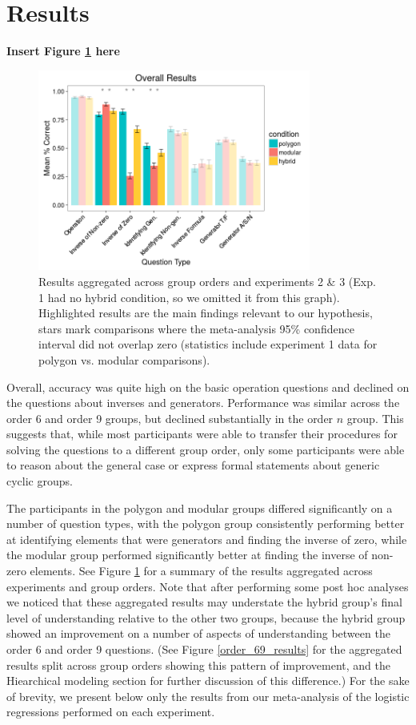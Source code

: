 \documentclass[man,10pt]{apa6}
\begin{document}
\section{Results}
\begin{center} 
{\bf Insert Figure \ref{overall_results} here} 
\end{center}
\begin{figure}
\centering
\includegraphics[width=0.8\textwidth]{figures/overall_results.png}
\caption{Results aggregated across group orders and experiments 2 \& 3 (Exp. 1 had no hybrid condition, so we omitted it from this graph). Highlighted results are the main findings relevant to our hypothesis, stars mark comparisons where the meta-analysis 95\% confidence interval did not overlap zero (statistics include experiment 1 data for polygon vs. modular comparisons).}
\label{overall_results}
\end{figure}
Overall, accuracy was quite high on the basic operation questions and declined on the questions about inverses and generators. Performance was similar across the order 6 and order 9 groups, but declined substantially in the order $n$ group. This suggests that, while most participants were able to transfer their procedures for solving the questions to a different group order, only some participants were able to reason about the general case or express formal statements about generic cyclic groups.\par
The participants in the polygon and modular groups differed significantly on a number of question types, with the polygon group consistently performing better at identifying elements that were generators and finding the inverse of zero, while the modular group performed significantly better at finding the inverse of non-zero elements. See Figure \ref{overall_results} for a summary of the results aggregated across experiments and group orders. Note that after performing some post hoc analyses we noticed that these aggregated results may understate the hybrid group's final level of understanding relative to the other two groups, because the hybrid group showed an improvement on a number of aspects of understanding between the order 6 and order 9 questions. (See Figure \ref{order_69_results} for the aggregated results split across group orders showing this pattern of improvement, and the Hiearchical modeling section for further discussion of this difference.) For the sake of brevity, we present below only the results from our meta-analysis of the logistic regressions performed on each experiment.
\end{document}
